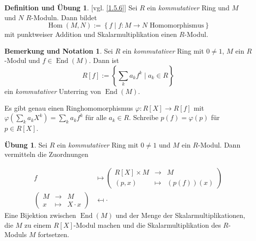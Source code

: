 \documentclass[
twoside=semi,
fontsize=12,
DIV=12, 
cleardoublepage=current,
leqno,
headings=optiontoheadandtoc, 
toc=idx
]{scrbook}
\newcommand{\brac}[1]{\left( #1 \right)}
\newcommand{\set}[1]{\left\{ #1 \right\}}
\DeclareMathOperator{\End}{End}
\DeclareMathOperator{\Hom}{Hom}
\theoremstyle{definition}
\newtheorem{def-ueb}[definition]{Definition und \"Ubung}
\newtheorem{uebung}[definition]{\"Ubung}
\newtheorem{bem-not}[definition]{Bemerkung und Notation}
\begin{document}
	\begin{def-ueb}\label{1.7.2} [vgl. \ref{1.5.6}]\newline
		Sei $R$ ein \emph{kommutativer} Ring und $M$ und $N$ $R$-Moduln. Dann bildet 
			\[\Hom(M,N) := \set{f \mid f:M \to N \textrm{ Homomorphismus}}\]
		mit punktweiser Addition und Skalarmultiplikation einen $R$-Modul.
	\end{def-ueb}

	\begin{bem-not}\label{1.7.3}\hfill\newline
		Sei $R$ ein \emph{kommutativer} Ring mit $0\neq 1$, $M$ ein $R$-Modul und $f \in \End(M)$. Dann ist 
		\[R[f] := \set{\sum_k a_k f^k \mid a_k \in R}\]
		ein \emph{kommutativer} Unterring von $\End(M)$.
		
		Es gibt genau einen Ringhomomorphismus $\varphi:R[X] \to R[f]$ mit \linebreak $\displaystyle \varphi\brac{\sum_k a_k X^k} = \sum_k a_k f^k$ f\"ur alle $a_k \in R$. Schreibe $p(f) = \varphi(p)$ f\"ur $p \in R[X]$.
	\end{bem-not}

	\begin{uebung}\label{1.7.4}\hfill\newline
		Sei $R$ ein \emph{kommutativer} Ring mit $0\neq 1$ und $M$ ein $R$-Modul. Dann vermitteln die Zuordnungen
		
		\begin{align*}
			f &\mapsto \begin{pmatrix}
				R[X]\times M &\to& M\\ (p,x) &\mapsto& (p(f))(x)
			\end{pmatrix}\\
			\begin{pmatrix}
				M &\to& M\\
				x &\mapsto& X \cdot x
			\end{pmatrix} &\mapsfrom \cdot
		\end{align*}
		Eine Bijektion zwischen $\End(M)$ und der Menge der Skalarmultiplikationen, die $M$ zu einem $R[X]$-Modul machen und die Skalarmultiplikation des $R$-Moduls $M$ fortsetzen.
	\end{uebung}
\end{document}
